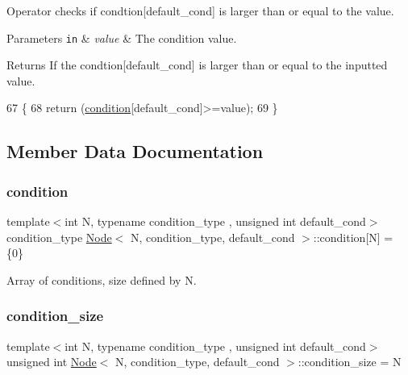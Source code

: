 Operator checks if {\ttfamily condtion}\mbox{[}{\ttfamily default\+\_\+cond}\mbox{]} is larger than or equal to the value. 
\begin{DoxyParams}[1]{Parameters}
\mbox{\tt in}  & {\em value} & The condition value. \\
\hline
\end{DoxyParams}
\begin{DoxyReturn}{Returns}
If the {\ttfamily condtion}\mbox{[}{\ttfamily default\+\_\+cond}\mbox{]} is larger than or equal to the inputted value. 
\end{DoxyReturn}

\begin{DoxyCode}
67     \{
68         \textcolor{keywordflow}{return} (\hyperlink{struct_node_a84fa4c586396e81041eb3a4f6a46f418}{condition}[default\_cond]>=value);
69     \}
\end{DoxyCode}


\subsection{Member Data Documentation}
\mbox{\label{struct_node_a84fa4c586396e81041eb3a4f6a46f418}} 
\subsubsection{\texorpdfstring{condition}{condition}}
{\footnotesize\ttfamily template$<$int N, typename condition\+\_\+type , unsigned int default\+\_\+cond$>$ \\
condition\+\_\+type \hyperlink{struct_node}{Node}$<$ N, condition\+\_\+type, default\+\_\+cond $>$\+::condition\mbox{[}N\mbox{]} = \{0\}}

Array of conditions, size defined by {\ttfamily N}. \mbox{\label{struct_node_a89d21337f6535c79bb46bbf132e57313}} 
\subsubsection{\texorpdfstring{condition\+\_\+size}{condition\_size}}
{\footnotesize\ttfamily template$<$int N, typename condition\+\_\+type , unsigned int default\+\_\+cond$>$ \\
unsigned int \hyperlink{struct_node}{Node}$<$ N, condition\+\_\+type, default\+\_\+cond $>$\+::condition\+\_\+size = N}

